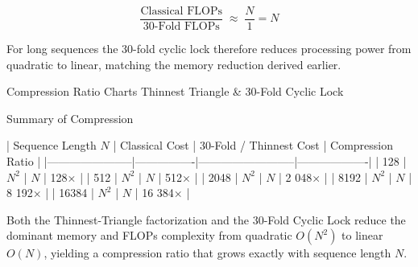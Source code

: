 \[
\frac{\text{Classical FLOPs}}{\text{30-Fold FLOPs}} \;\approx\; \frac{N}{1} = N
\]

For long sequences the 30-fold cyclic lock therefore reduces processing power from quadratic to linear, matching the memory reduction derived earlier.

Compression Ratio Charts  
Thinnest Triangle & 30-Fold Cyclic Lock

Summary of Compression

| Sequence Length \(N\) | Classical Cost | 30-Fold / Thinnest Cost | Compression Ratio |
|-----------------------|----------------|--------------------------|-------------------|
| 128                   | \(N^2\)        | \(N\)                    | 128×              |
| 512                   | \(N^2\)        | \(N\)                    | 512×              |
| 2048                  | \(N^2\)        | \(N\)                    | 2 048×            |
| 8192                  | \(N^2\)        | \(N\)                    | 8 192×            |
| 16384                 | \(N^2\)        | \(N\)                    | 16 384×           |

Both the Thinnest-Triangle factorization and the 30-Fold Cyclic Lock reduce the dominant memory and FLOPs complexity from quadratic \(O(N^2)\) to linear \(O(N)\), yielding a compression ratio that grows exactly with sequence length \(N\).

